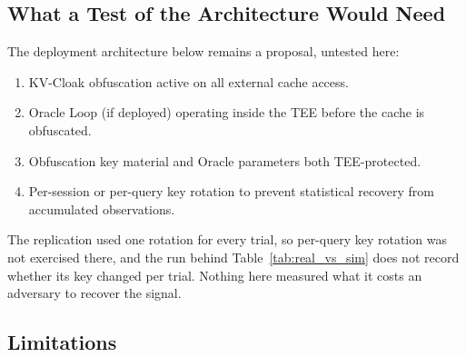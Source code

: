 \documentclass[11pt,a4paper]{article}
\begin{document}
\subsection{What a Test of the Architecture Would Need}

The deployment architecture below remains a proposal, untested here:

\begin{enumerate}
\item KV-Cloak obfuscation active on all external cache access.
\item Oracle Loop (if deployed) operating inside the TEE before the cache
is obfuscated.
\item Obfuscation key material and Oracle parameters both
TEE-protected.
\item Per-session or per-query key rotation to prevent statistical
recovery from accumulated observations.
\end{enumerate}

The replication used one rotation for every trial, so per-query key
rotation was not exercised there, and the run behind
Table~\ref{tab:real_vs_sim} does not record whether its key changed per
trial. Nothing here measured what it costs an adversary to recover the
signal.

\subsection{Limitations}
\end{document}
